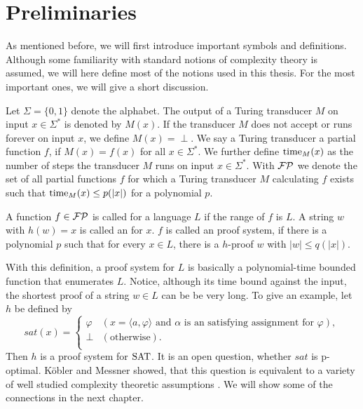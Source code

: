 \chapter{Preliminaries}
  As mentioned before, we will first introduce important symbols and definitions. Although some familiarity with standard notions of complexity theory is assumed, we will here define most of the notions used in this thesis. For the most important ones, we will give a short discussion.

  Let \(\Sigma = \{ 0, 1 \}\) denote the alphabet. The output of a Turing transducer \(M\) on input \(x \in \Sigma^*\) is denoted by \(M(x)\). If the transducer \(M\) does not accept or runs forever on input \(x\), we define \(M(x) = \perp\). We say a Turing transducer  a partial function \(f\), if \(M(x) = f(x)\) for all \(x \in \Sigma^*\). We further define \(\operatorname{time}_M(x)\) as the number of steps the transducer \(M\) runs on input \(x \in \Sigma^*\). With \(\mathcal{FP}\) we denote the set of all partial functions \(f\) for which a Turing transducer \(M\) calculating \(f\) exists such that \(\operatorname{time}_M(x) \leq p(|x|)\) for a polynomial \(p\).

  \begin{definition}
    A function \(f \in \mathcal{FP}\) is called  for a language \(L\) if the range of \(f\) is \(L\). A string \(w\) with \(h(w) = x\) is called an  for \(x\). \(f\) is called an  proof system, if there is a polynomial \(p\) such that for every \(x \in L\), there is a \(h\)-proof \(w\) with \(|w| \leq q(|x|)\).
  \end{definition}

  With this definition, a proof system for \(L\) is basically a polynomial-time bounded function that enumerates \(L\). Notice, although its time bound against the input, the shortest proof of a string \(w \in L\) can be be very long. To give an example, let \(h\) be defined by
    \[
       sat(x) =
       \begin{cases}
         \varphi & (x = \langle a, \varphi \rangle \text{ and \(\alpha\) is an satisfying assignment for \(\varphi\)}), \\
         \perp & (\text{otherwise}). \\
       \end{cases}
    \]
  Then \(h\) is a proof system for \(\text{SAT}\). It is an open question, whether \(sat\) is p-optimal. Köbler and Messner showed, that this question is equivalent to a variety of well studied complexity theoretic assumptions \cite{KM00}. We will show some of the connections in the next chapter.

